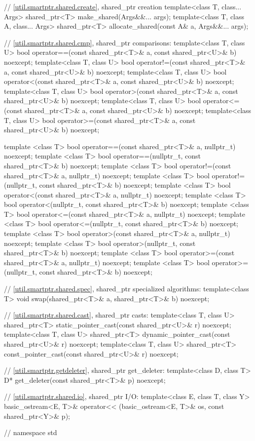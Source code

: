\begin{codeblock}
{  // \ref{util.smartptr.shared.create}, shared_ptr creation
  template<class T, class... Args> shared_ptr<T> make_shared(Args&&... args);
  template<class T, class A, class... Args>
    shared_ptr<T> allocate_shared(const A& a, Args&&... args);

  // \ref{util.smartptr.shared.cmp}, shared_ptr comparisons:
  template<class T, class U>
    bool operator==(const shared_ptr<T>& a, const shared_ptr<U>& b) noexcept;
  template<class T, class U>
    bool operator!=(const shared_ptr<T>& a, const shared_ptr<U>& b) noexcept;
  template<class T, class U>
    bool operator<(const shared_ptr<T>& a, const shared_ptr<U>& b) noexcept;
  template<class T, class U>
    bool operator>(const shared_ptr<T>& a, const shared_ptr<U>& b) noexcept;
  template<class T, class U>
    bool operator<=(const shared_ptr<T>& a, const shared_ptr<U>& b) noexcept;
  template<class T, class U>
    bool operator>=(const shared_ptr<T>& a, const shared_ptr<U>& b) noexcept;

  template <class T>
    bool operator==(const shared_ptr<T>& a, nullptr_t) noexcept;
  template <class T>
    bool operator==(nullptr_t, const shared_ptr<T>& b) noexcept;
  template <class T>
    bool operator!=(const shared_ptr<T>& a, nullptr_t) noexcept;
  template <class T>
    bool operator!=(nullptr_t, const shared_ptr<T>& b) noexcept;
  template <class T>
    bool operator<(const shared_ptr<T>& a, nullptr_t) noexcept;
  template <class T>
    bool operator<(nullptr_t, const shared_ptr<T>& b) noexcept;
  template <class T>
    bool operator<=(const shared_ptr<T>& a, nullptr_t) noexcept;
  template <class T>
    bool operator<=(nullptr_t, const shared_ptr<T>& b) noexcept;
  template <class T>
    bool operator>(const shared_ptr<T>& a, nullptr_t) noexcept;
  template <class T>
    bool operator>(nullptr_t, const shared_ptr<T>& b) noexcept;
  template <class T>
    bool operator>=(const shared_ptr<T>& a, nullptr_t) noexcept;
  template <class T>
    bool operator>=(nullptr_t, const shared_ptr<T>& b) noexcept;

  // \ref{util.smartptr.shared.spec}, shared_ptr specialized algorithms:
  template<class T> void swap(shared_ptr<T>& a, shared_ptr<T>& b) noexcept;

  // \ref{util.smartptr.shared.cast}, shared_ptr casts:
  template<class T, class U>
    shared_ptr<T> static_pointer_cast(const shared_ptr<U>& r) noexcept;
  template<class T, class U>
    shared_ptr<T> dynamic_pointer_cast(const shared_ptr<U>& r) noexcept;
  template<class T, class U>
    shared_ptr<T> const_pointer_cast(const shared_ptr<U>& r) noexcept;

  // \ref{util.smartptr.getdeleter}, shared_ptr get_deleter:
  template<class D, class T> D* get_deleter(const shared_ptr<T>& p) noexcept;

  // \ref{util.smartptr.shared.io}, shared_ptr I/O:
  template<class E, class T, class Y>
    basic_ostream<E, T>& operator<< (basic_ostream<E, T>& os, const shared_ptr<Y>& p);
} // namespace std
\end{codeblock}

